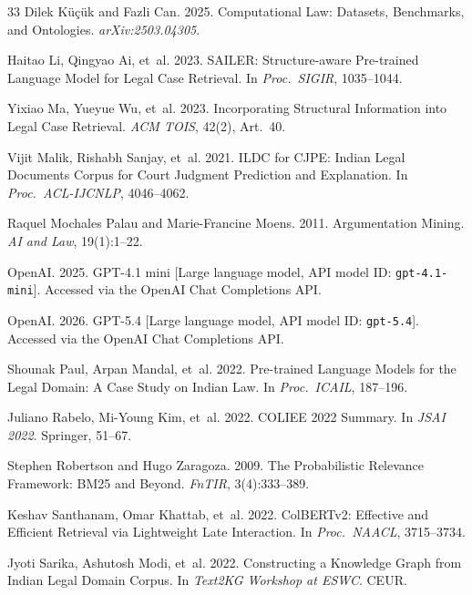 \documentclass[11pt]{article}
\begin{document}
\begin{thebibliography}{33}
Dilek K\"{u}\c{c}\"{u}k and Fazli Can. 2025. Computational Law: Datasets, Benchmarks, and Ontologies. \emph{arXiv:2503.04305}.

Haitao Li, Qingyao Ai, et~al. 2023. SAILER: Structure-aware Pre-trained Language Model for Legal Case Retrieval. In \emph{Proc.\ SIGIR}, 1035--1044.

Yixiao Ma, Yueyue Wu, et~al. 2023. Incorporating Structural Information into Legal Case Retrieval. \emph{ACM TOIS}, 42(2), Art.~40.

Vijit Malik, Rishabh Sanjay, et~al. 2021. ILDC for CJPE: Indian Legal Documents Corpus for Court Judgment Prediction and Explanation. In \emph{Proc.\ ACL-IJCNLP}, 4046--4062.

Raquel Mochales Palau and Marie-Francine Moens. 2011. Argumentation Mining. \emph{AI and Law}, 19(1):1--22.

OpenAI. 2025. GPT-4.1 mini [Large language model, API model ID: \texttt{gpt-4.1-mini}]. Accessed via the OpenAI Chat Completions API.

OpenAI. 2026. GPT-5.4 [Large language model, API model ID: \texttt{gpt-5.4}]. Accessed via the OpenAI Chat Completions API.

Shounak Paul, Arpan Mandal, et~al. 2022. Pre-trained Language Models for the Legal Domain: A Case Study on Indian Law. In \emph{Proc.\ ICAIL}, 187--196.

Juliano Rabelo, Mi-Young Kim, et~al. 2022. COLIEE 2022 Summary. In \emph{JSAI 2022}. Springer, 51--67.

Stephen Robertson and Hugo Zaragoza. 2009. The Probabilistic Relevance Framework: BM25 and Beyond. \emph{FnTIR}, 3(4):333--389.

Keshav Santhanam, Omar Khattab, et~al. 2022. ColBERTv2: Effective and Efficient Retrieval via Lightweight Late Interaction. In \emph{Proc.\ NAACL}, 3715--3734.

Jyoti Sarika, Ashutosh Modi, et~al. 2022. Constructing a Knowledge Graph from Indian Legal Domain Corpus. In \emph{Text2KG Workshop at ESWC}. CEUR.


\end{thebibliography}
\end{document}
